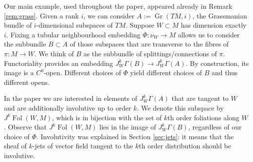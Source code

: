 \documentclass[10pt]{amsart}
\newcommand{\Gr}{\operatorname{Gr}}
\newcommand{\FolObj}{{\operatorname{Fol}}}
\numberwithin{theoremalpha}{section}
\numberwithin{equation}{section}
\numberwithin{definition}{section}
\numberwithin{theorem}{section}
\numberwithin{proposition}{section}
\numberwithin{lemma}{section}
\numberwithin{example}{section}
\numberwithin{remark}{section}
\numberwithin{corollary}{section}
\numberwithin{question}{section}
\numberwithin{problem}{section}
\numberwithin{assumption}{section}
\theoremstyle{named}
\numberwithin{equation}{section}
\begin{document}
\begin{example} \label{ex:grass2}
Our main example, used throughout the paper, appeared already in Remark \ref{rem:grass}. Given a rank $i$, we can consider $A := \Gr(TM,i)$, the Grassmanian bundle of $i$-dimensional subspaces of $TM$. Suppose $W \subset M$ has dimension exactly $i$. Fixing a tubular neighbourhood embedding $\Phi: \nu_{W} \to M$ allows us to consider the subbundle $B \subset A$ of those subspaces that are transverse to the fibres of $\pi: M \rightarrow W$. We think of $B$ as the subbundle of splittings/connections of $\pi$. Functoriality provides an embedding $J^k_W\Gamma(B) \rightarrow J^k_W\Gamma(A)$. By construction, its image is a $C^0$-open. Different choices of $\Phi$ yield different choices of $B$ and thus different opens.

In the paper we are interested in elements of $J^k_W\Gamma(A)$ that are tangent to $W$ and are additionally involutive up to order $k$. We denote this subspace by $J^{k}\FolObj(W,M)$, which is in bijection with the set of $k$th order foliations along $W$. Observe that $J^{k}\FolObj(W,M)$ lies in the image of $J^k_W\Gamma(B)$, regardless of our choice of $\Phi$. Involutivity was explained in Section \ref{sec:jets}: it means that the sheaf of $k$-jets of vector field tangent to the $k$th order distribution should be involutive.
\end{example}
\end{document}
